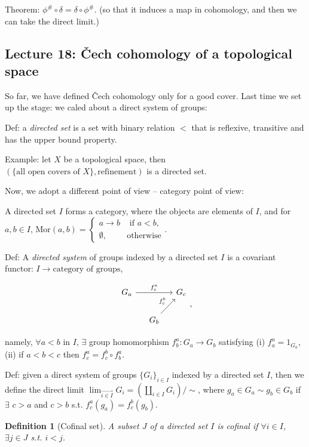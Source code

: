 \documentclass{article}
\theoremstyle{mystyle}
\newtheorem*{definition}{Definition}%
\theoremstyle{remark}
\numberwithin{equation}{section}
\begin{document}
Theorem: $\phi^\#\circ \delta = \delta \circ \phi^\#$. (so that it induces a map in cohomology, and then we can take the direct limit.)


\subsection{Lecture 18: Čech cohomology of a topological space}

So far, we have defined Čech cohomology only for a good cover. Last time we set up the stage: we caled about a direct system of groups:

Def: a \emph{directed set} is a set with binary relation $<$ that is reflexive, transitive and has the upper bound property. 

Example: let $X$ be a topological space, then $\left(\{\text{all open covers of }X\},\text{refinement}\right)$ is a directed set.


Now, we adopt a different point of view -- category point of view:

A directed set $I$ forms a category, where the objects are elements of $I$, and for $a,b\in I$, $\mathrm{Mor}(a,b) = \left\{\begin{array}{ll} a\rightarrow b & \text{ if }a<b,\\
\emptyset, &\text{otherwise}\end{array}\right.$. 

Def: A \emph{directed system} of groups indexed by a directed set $I$ is a covariant functor: $I\rightarrow \text{category of groups}$, 

$$\begin{tikzcd}[column sep = small] G_a\ar[rr,"f^a_c"] &&G_c\\
&G_b \ar[ru,"f^b_c"]
\end{tikzcd},$$

namely, $\forall a<b$ in $I$, $\exists$ group homomorphism $f^a_b\colon G_a\rightarrow G_b$ satisfying (i) $f^a_a = 1_{G_a}$, (ii) if $a<b<c$ then $f^a_c = f^b_c\circ f^a_b$. 

Def: given a direct system of groups $\{G_i\}_{i\in I}$ indexed by a directed set $I$, then we define the direct limit
$\lim_{\stackrel{\longrightarrow}{i\in I}} G_i
=\left(\amalg_{i\in I} G_i\right)/\sim$, where $g_a\in G_a \sim g_b\in G_b$ if $\exists$ $c>a$ and $c>b$ s.t. $f^a_c(g_a) = f^b_c(g_b)$. 

\begin{definition}[Cofinal set] A subset $J$ of a directed set $I$ is \emph{cofinal} if $\forall i\in I$, $\exists j \in J$ s.t. $i<j$.
\end{definition}
\end{document}
